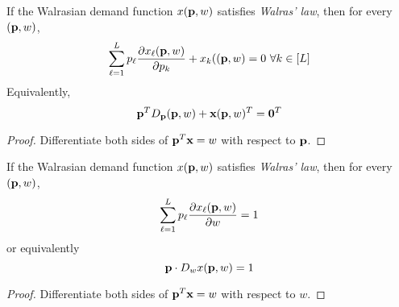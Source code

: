 \documentclass{article}
\begin{document}
 			\begin{proposition}
 				If the Walrasian demand function $x(\textbf{p}, w)$ satisfies \emph{Walras' law}, then for every $(\textbf{p}, w)$,
 				\begin{equation}
 					\sum_{\ell=1}^L p_\ell \frac{\partial{x_\ell(\textbf{p}, w)}}{\partial{p_k}} + x_k((\textbf{p}, w) = 0\ \forall k \in [L]
 				\end{equation}
 				Equivalently,
 				\begin{equation}
 					\textbf{p}^T D_{\textbf{p}} (\textbf{p}, w) + \textbf{x}(\textbf{p}, w)^T = \textbf{0}^T
 				\end{equation}
 				\begin{proof}
 					Differentiate both sides of $\textbf{p}^T \textbf{x} = w$ with respect to $\textbf{p}$.
 				\end{proof}
 			\end{proposition}
 			
 			\begin{proposition}
 				If the Walrasian demand function $x(\textbf{p}, w)$ satisfies \emph{Walras' law}, then for every $(\textbf{p}, w)$,
 				\begin{equation}
 					\sum_{\ell=1}^L p_\ell \frac{\partial{x_\ell(\textbf{p}, w)}}{\partial{w}} = 1
 				\end{equation}
 				or equivalently
 				\begin{equation}
 					\textbf{p} \cdot D_{w} x(\textbf{p}, w) = 1
 				\end{equation}
 				\begin{proof}
 					Differentiate both sides of $\textbf{p}^T \textbf{x} = w$ with respect to $w$.
 				\end{proof}
 			\end{proposition}
\end{document}
